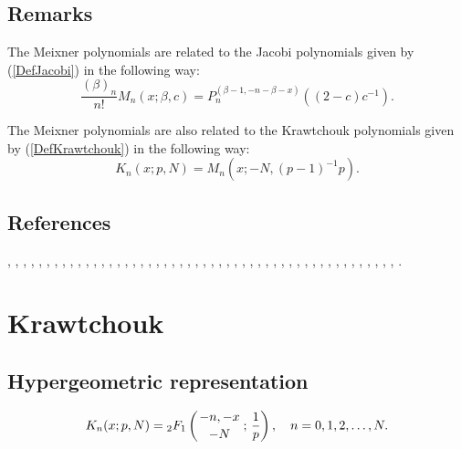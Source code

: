 \documentclass[envcountchap,graybox]{svmono}
\newcommand{\hyp}[5]{\mbox{}_{#1}{F}_{#2}
\left(\genfrac{}{}{0pt}{}{#3}{#4}\,;\,#5\right)}
\begin{document}
\subsection*{Remarks}
The Meixner polynomials are related to the Jacobi polynomials given by (\ref{DefJacobi})
in the following way:
$$\frac{(\beta)_n}{n!}M_n(x;\beta,c)=P_n^{(\beta-1,-n-\beta-x)}((2-c)c^{-1}).$$

\noindent
The Meixner polynomials are also related to the Krawtchouk polynomials given by
(\ref{DefKrawtchouk}) in the following way:
$$K_n(x;p,N)=M_n(x;-N,(p-1)^{-1}p).$$

\subsection*{References}
\cite{Allaway76}, \cite{NAlSalam66}, \cite{AlSalam90}, \cite{AlSalamChihara76},
\cite{AlSalamIsmail76}, \cite{Alvarez+}, \cite{AndrewsAskey85}, \cite{Area+II}, \cite{Askey75},
\cite{Askey89I}, \cite{Askey2005}, \cite{AskeyGasper77}, \cite{AskeyIsmail76},
\cite{AskeyWilson85}, \cite{AtakRahmanSuslov}, \cite{AtakSuslov88}, \cite{Bavinck98},
\cite{BavinckHaeringen}, \cite{Campigotto+}, \cite{Chihara78}, \cite{Cooper+},
\cite{Erdelyi+}, \cite{FoataLabelle}, \cite{Gabutti}, \cite{GabuttiMathis}, \cite{Gasper73I},
\cite{Gasper74}, \cite{HoareRahman}, \cite{Ismail2005II}, \cite{IsmailLetVal88},
\cite{IsmailLi}, \cite{IsmailMuldoon}, \cite{IsmailStanton97}, \cite{JinWong},
\cite{Karlin58}, \cite{Koekoek2000}, \cite{Koorn88}, \cite{LabelleYehI}, \cite{LabelleYehII},
\cite{Lesky89}, \cite{Lesky94I}, \cite{Lesky95II}, \cite{LewanowiczII}, \cite{Meixner},
\cite{Nikiforov+}, \cite{NikiforovUvarov}, \cite{Rahman78I}, \cite{ValentAssche},
\cite{Viennot}, \cite{Zarzo+}, \cite{Zeng90}.


\section{Krawtchouk}

\par\setcounter{equation}{0}

\subsection*{Hypergeometric representation}
\begin{equation}
\label{DefKrawtchouk}
K_n(x;p,N)=\hyp{2}{1}{-n,-x}{-N}{\frac{1}{p}},\quad n=0,1,2,\ldots,N.
\end{equation}
\end{document}
